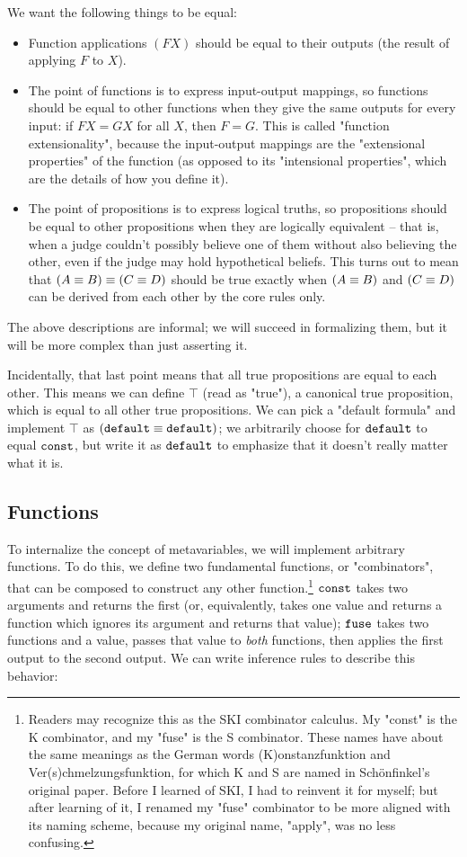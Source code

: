 \documentclass{article}
\begin{document}
  We want the following things to be equal:
  
  \begin{itemize}
    \item Function applications $(FX)$ should be equal to their outputs (the result of applying $F$ to $X$).
    \item The point of functions is to express input-output mappings, so functions should be equal to other functions when they give the same outputs for every input: if $FX = GX$ for all $X$, then $F = G$. This is called "function extensionality", because the input-output mappings are the "extensional properties" of the function (as opposed to its "intensional properties", which are the details of how you define it).
    \item The point of propositions is to express logical truths, so propositions should be equal to other propositions when they are logically equivalent – that is, when a judge couldn't possibly believe one of them without also believing the other, even if the judge may hold hypothetical beliefs. This turns out to mean that $(A \equiv B) \equiv (C \equiv D)$ should be true exactly when $(A \equiv B)$ and $(C \equiv D)$ can be derived from each other by the core rules only.
  \end{itemize}
  
  The above descriptions are informal; we will succeed in formalizing them, but it will be more complex than just asserting it.
  
  Incidentally, that last point means that all true propositions are equal to each other. This means we can define $\top$ (read as "true"), a canonical true proposition, which is equal to all other true propositions. We can pick a "default formula" and implement $\top$ as $(\operatorname{\texttt{default}}\equiv\operatorname{\texttt{default}})$; we arbitrarily choose for $\operatorname{\texttt{default}}$ to equal $\operatorname{\texttt{const}}$, but write it as $\operatorname{\texttt{default}}$ to emphasize that it doesn't really matter what it is.
  
  \subsection{Functions}

  To internalize the concept of metavariables, we will implement arbitrary functions. To do this, we define two fundamental functions, or "combinators", that can be composed to construct any other function.\footnote{Readers may recognize this as the SKI combinator calculus. My "const" is the K combinator, and my "fuse" is the S combinator. These names have about the same meanings as the German words (K)onstanzfunktion and Ver(s)chmelzungsfunktion, for which K and S are named in Schönfinkel's original paper. Before I learned of SKI, I had to reinvent it for myself; but after learning of it, I renamed my "fuse" combinator to be more aligned with its naming scheme, because my original name, "apply", was no less confusing.} $\operatorname{\texttt{const}}$ takes two arguments and returns the first (or, equivalently, takes one value and returns a function which ignores its argument and returns that value); $\operatorname{\texttt{fuse}}$ takes two functions and a value, passes that value to \emph{both} functions, then applies the first output to the second output. We can write inference rules to describe this behavior:
  
\end{document}
